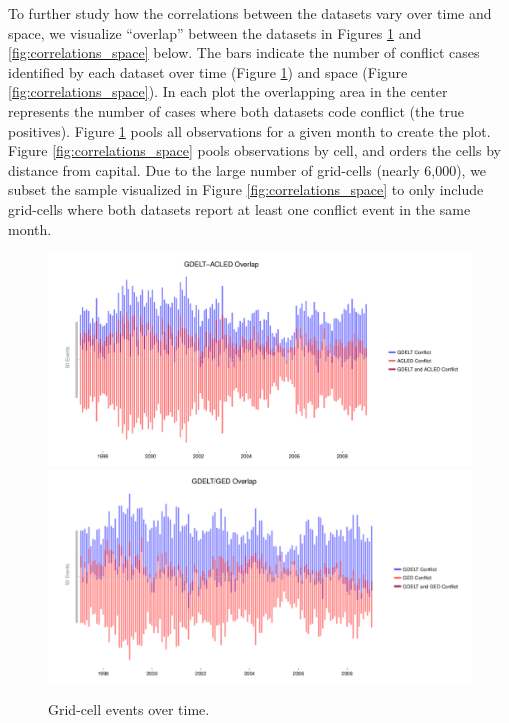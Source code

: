 \documentclass[hidelinks]{article}
\begin{document}
To further study how the correlations between the datasets vary over time and space, we visualize ``overlap'' between the datasets in Figures \ref{fig:correlations_time} and \ref{fig:correlations_space} below. The bars indicate the number of conflict cases identified by each dataset over time (Figure \ref{fig:correlations_time}) and space (Figure \ref{fig:correlations_space}). In each plot the overlapping area in the center represents the number of cases where both datasets code conflict (the true positives). Figure \ref{fig:correlations_time} pools all observations for a given month to create the plot. Figure \ref{fig:correlations_space} pools observations by cell, and orders the cells by distance from capital. Due to the large number of grid-cells (nearly 6,000), we subset the sample visualized in Figure \ref{fig:correlations_space} to only include grid-cells where both datasets report at least one conflict event in the same month.

\begin{figure}[!htbp]
\includegraphics[width = 1 \textwidth]{timeACLED.pdf}\\
\includegraphics[width = 1 \textwidth]{timeGED.pdf}
\caption{Grid-cell events over time.}\label{fig:correlations_time}
\end{figure}
\end{document}
